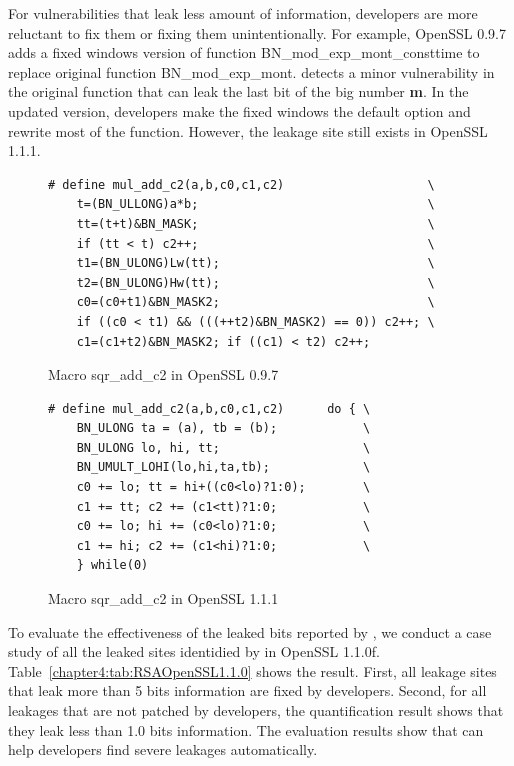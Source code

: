 For vulnerabilities that leak less amount of information,
developers are more reluctant to fix them or fixing them unintentionally. For example, OpenSSL 0.9.7 adds a fixed windows version of function \textsf{BN\_mod\_exp\_mont\_consttime} to replace original function \textsf{BN\_mod\_exp\_mont}.
\tool{} detects a minor vulnerability in the original function that can leak the last bit of the big number \textbf{m}. In the updated version, developers make the fixed windows the default option and rewrite most of the function. However, the leakage site still exists in OpenSSL 1.1.1.
\begin{figure}
    \centering
    \begin{lstlisting}[xleftmargin=.2\textwidth, xrightmargin=.0\textwidth, frame=none]
# define mul_add_c2(a,b,c0,c1,c2)                    \
    t=(BN_ULLONG)a*b;                                \
    tt=(t+t)&BN_MASK;                                \
    if (tt < t) c2++;                                \
    t1=(BN_ULONG)Lw(tt);                             \
    t2=(BN_ULONG)Hw(tt);                             \
    c0=(c0+t1)&BN_MASK2;                             \
    if ((c0 < t1) && (((++t2)&BN_MASK2) == 0)) c2++; \
    c1=(c1+t2)&BN_MASK2; if ((c1) < t2) c2++;
\end{lstlisting}
    \vspace*{-6pt}
    \caption{Macro \textsf{sqr\_add\_c2} in OpenSSL 0.9.7}
    \label{fig:old_sqr2}
    \vspace*{-8pt}
\end{figure}


\begin{figure}
    \centering
    \begin{lstlisting}[xleftmargin=.2\textwidth, xrightmargin=.0\textwidth, frame=none]
# define mul_add_c2(a,b,c0,c1,c2)      do { \
    BN_ULONG ta = (a), tb = (b);            \
    BN_ULONG lo, hi, tt;                    \
    BN_UMULT_LOHI(lo,hi,ta,tb);             \
    c0 += lo; tt = hi+((c0<lo)?1:0);        \
    c1 += tt; c2 += (c1<tt)?1:0;            \
    c0 += lo; hi += (c0<lo)?1:0;            \
    c1 += hi; c2 += (c1<hi)?1:0;            \
    } while(0)
\end{lstlisting}
\caption{Macro \textsf{sqr\_add\_c2} in OpenSSL 1.1.1}
\label{fig:new_sqr2}
\end{figure}

To evaluate the effectiveness of the leaked bits reported by \tool{}, we conduct a case study of all the leaked sites identidied by \tool{} in OpenSSL 1.1.0f. Table~\ref{chapter4:tab:RSAOpenSSL1.1.0} shows the result. First, all leakage sites that leak more than 5 bits information are fixed by developers. Second, for all leakages that are not patched by developers, the quantification result shows that they leak less than 1.0 bits information. The evaluation results show that \tool{} can help developers find severe leakages automatically.

